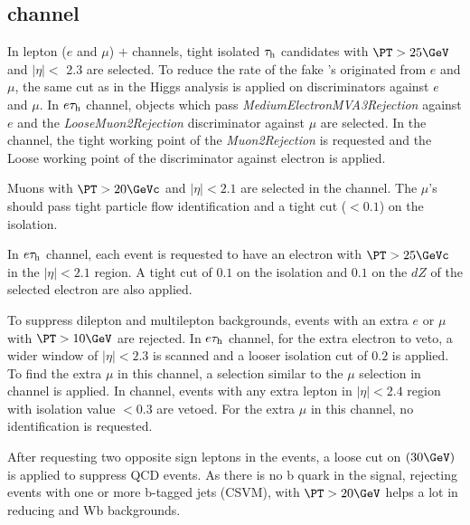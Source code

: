 \subsection{\texorpdfstring{\leptonTau channel}{lepton-tau channel}}
\label{sect:leptonTauCuts}
In lepton ($e$ and $\mu$) $+$ \Tau channels, tight isolated $\tau_{\rm h}$ candidates with $\PT > 25 \GeV$ and $|\eta| <$ 2.3 are selected. To reduce the rate of the fake \Tau's originated from $e$ and $\mu$, the same cut as in the Higgs analysis \cite{CMS_AN_2013-171} is applied on discriminators against $e$ and $\mu$. In $e\tau_{\rm h}$ channel, \Tau objects which pass \emph{MediumElectronMVA3Rejection} against $e$ and the \emph{LooseMuon2Rejection} discriminator against $\mu$ are selected. In the \muTau channel, the tight working point of the \emph{Muon2Rejection} is requested and the Loose working point of the discriminator against electron is applied.

Muons with $\PT > 20 \GeVc$ and $|\eta|<2.1$ are selected in the \muTau channel. The $\mu$'s should pass tight particle flow identification and a tight cut ($<0.1$) on the isolation.
 
In $e\tau_{\rm h}$ channel, each event is requested to have an electron with $\PT >25 \GeVc$ in the $|\eta| < 2.1 $ region. A tight cut of $0.1$ on the isolation and $0.1$ on the $dZ$ of the selected electron are also applied.

To suppress dilepton and multilepton backgrounds, events with an extra $e$ or $\mu$ with $\PT >10 \GeV$ are rejected. In $e\tau_{\rm h}$ channel, for the extra electron to veto, a wider window of $|\eta|<2.3$ is scanned and a looser isolation cut of $0.2$ is applied. To find the extra $\mu$ in this channel, a selection similar to the $\mu$ selection in \muTau channel is applied. In \muTau channel, events with any extra lepton in $|\eta|<2.4$ region with isolation value $<0.3$ are vetoed. For the extra $\mu$ in this channel, no identification is requested.


After requesting two opposite sign leptons in the events, a loose cut on \MPT $(30 \GeV)$ is applied to suppress QCD events. As there is no b quark in the signal, rejecting events with one or more b-tagged jets (CSVM), with $\PT > 20 \GeV$ helps a lot in reducing \ttbar and Wb backgrounds.

